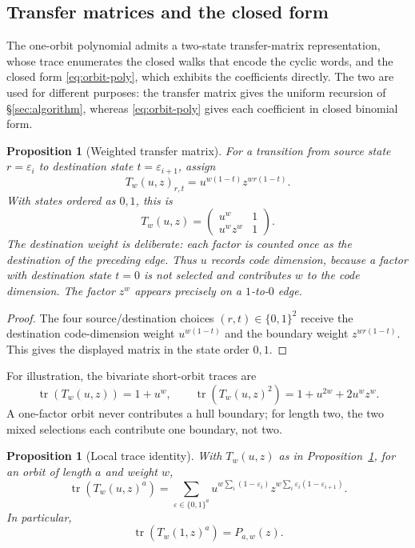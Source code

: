 \documentclass[10pt,a4paper]{article}
\numberwithin{equation}{section}
\theoremstyle{plain}
\newtheorem{proposition}[theorem]{Proposition}
\theoremstyle{definition}
\theoremstyle{remark}
\begin{document}
\subsection{Transfer matrices and the closed form}\label{sec:transfer}

The one-orbit polynomial admits a two-state transfer-matrix representation, whose
trace enumerates the closed walks that encode the cyclic words, and the closed
form \eqref{eq:orbit-poly}, which exhibits the coefficients directly. The two are
used for different purposes: the transfer matrix gives the uniform recursion of
\S\ref{sec:algorithm}, whereas \eqref{eq:orbit-poly} gives each coefficient in
closed binomial form.

\begin{proposition}[Weighted transfer matrix]\label{prop:transfer-matrix}
For a transition from source state $r=\varepsilon_i$ to destination state
$t=\varepsilon_{i+1}$, assign
\[
T_w(u,z)_{r,t}=u^{w(1-t)}z^{wr(1-t)}.
\]
With states ordered as $0,1$, this is
\begin{equation}\label{eq:transfer}
T_w(u,z)=\begin{pmatrix}u^w&1\\u^wz^w&1\end{pmatrix}.
\end{equation}
The destination weight is deliberate: each factor is counted once as the
destination of the preceding edge. Thus $u$ records code dimension, because a
factor with destination state $t=0$ is not selected and contributes $w$ to the
code dimension. The factor $z^w$ appears precisely on a $1$-to-$0$ edge.
\end{proposition}

\begin{proof}
The four source/destination choices $(r,t)\in\{0,1\}^2$ receive the destination
code-dimension weight $u^{w(1-t)}$ and the boundary weight $z^{wr(1-t)}$. This
gives the displayed matrix in the state order $0,1$.
\end{proof}

For illustration, the bivariate short-orbit traces are
\[
\operatorname{tr}(T_w(u,z))=1+u^w,\qquad
\operatorname{tr}(T_w(u,z)^2)=1+u^{2w}+2u^wz^w.
\]
A one-factor orbit never contributes a hull boundary; for length two, the two
mixed selections each contribute one boundary, not two.

\begin{proposition}[Local trace identity]\label{prop:trace}
With $T_w(u,z)$ as in Proposition~\ref{prop:transfer-matrix}, for an orbit of
length $a$ and weight $w$,
\begin{equation}\label{eq:trace}
\operatorname{tr}(T_w(u,z)^a)
 =\sum_{\varepsilon\in\{0,1\}^a}
 u^{w\sum_i(1-\varepsilon_i)}z^{w\sum_i\varepsilon_i(1-\varepsilon_{i+1})}.
\end{equation}
In particular,
\[
\operatorname{tr}(T_w(1,z)^a)=P_{a,w}(z).
\]
\end{proposition}
\end{document}
